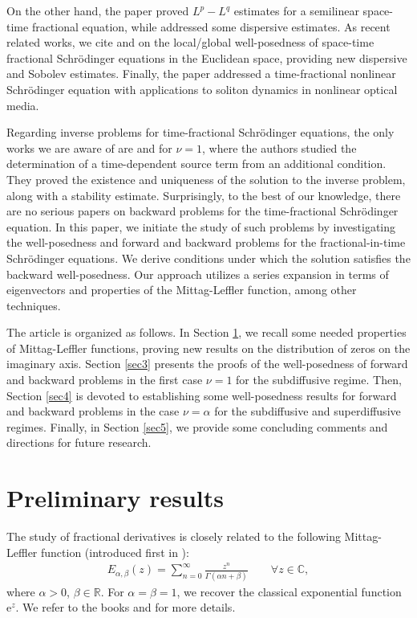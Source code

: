 \documentclass[reqno]{amsart}
\numberwithin{equation}{section}
\begin{document}
On the other hand, the paper \cite{Su19} proved $L^p-L^q$ estimates for a semilinear space-time fractional equation, while \cite{Su21} addressed some dispersive estimates. As recent related works, we cite \cite{Zh25} and \cite{Zh252} on the local/global well-posedness of space-time fractional Schrödinger equations in the Euclidean space, providing new dispersive and Sobolev estimates. Finally, the paper \cite{murad25} addressed a time-fractional nonlinear Schrödinger equation with applications to soliton dynamics in nonlinear optical media.

Regarding inverse problems for time-fractional Schrödinger equations, the only works we are aware of are \cite{AS23} and \cite{AS22} for $\nu=1$, where the authors studied the determination of a time-dependent source term from an additional condition. They proved the existence and uniqueness of the solution to the inverse problem, along with a stability estimate. Surprisingly, to the best of our knowledge, there are no serious papers on backward problems for the time-fractional Schrödinger equation. In this paper, we initiate the study of such problems by investigating the well-posedness and forward and backward problems for the fractional-in-time Schrödinger equations. We derive conditions under which the solution satisfies the backward well-posedness. Our approach utilizes a series expansion in terms of eigenvectors and properties of the Mittag-Leffler function, among other techniques.

The article is organized as follows. In Section \ref{sec2}, we recall some needed properties of Mittag-Leffler functions, proving new results on the distribution of zeros on the imaginary axis. Section \ref{sec3} presents the proofs of the well-posedness of forward and backward problems in the first case $\nu=1$ for the subdiffusive regime. Then, Section \ref{sec4} is devoted to establishing some well-posedness results for forward and backward problems in the case $\nu=\alpha$ for the subdiffusive and superdiffusive regimes. Finally, in Section \ref{sec5}, we provide some concluding comments and directions for future research.

\section{Preliminary results}\label{sec2}
The study of fractional derivatives is closely related to the following Mittag-Leffler function (introduced first in \cite{ML03}):
\begin{align*}
    E_{\alpha,\beta}(z)=\sum_{n=0}^{\infty}\frac{z^n}{\Gamma(\alpha n+\beta)} \qquad \forall z\in\mathbb{C},
\end{align*}
where $\alpha>0$, $\beta\in \mathbb{R}$. For $\alpha=\beta=1$, we recover the classical exponential function $\mathrm{e}^{z}$. We refer to the books \cite{podlubny99} and \cite{Gor20} for more details.
\end{document}
